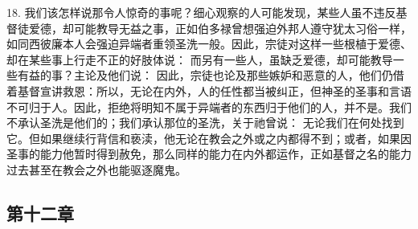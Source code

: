 18. 我们该怎样说那令人惊奇的事呢？细心观察的人可能发现，某些人虽不违反基督徒爱德，却可能教导无益之事，正如伯多禄曾想强迫外邦人遵守犹太习俗一样， 如同西彼廉本人会强迫异端者重领圣洗一般。因此，宗徒对这样一些根植于爱德、却在某些事上行走不正的好肢体说： 而另有一些人，虽缺乏爱德，却可能教导一些有益的事？主论及他们说： 因此，宗徒也论及那些嫉妒和恶意的人，他们仍借着基督宣讲救恩：所以，无论在内外，人的任性都当被纠正，但神圣的圣事和言语不可归于人。因此，拒绝将明知不属于异端者的东西归于他们的人，并不是。我们不承认圣洗是他们的；我们承认那位的圣洗，关于祂曾说： 无论我们在何处找到它。但如果继续行背信和亵渎，他无论在教会之外或之内都得不到；或者，如果因圣事的能力他暂时得到赦免，那么同样的能力在内外都运作，正如基督之名的能力过去甚至在教会之外也能驱逐魔鬼。\par


\subsection{第十二章}

